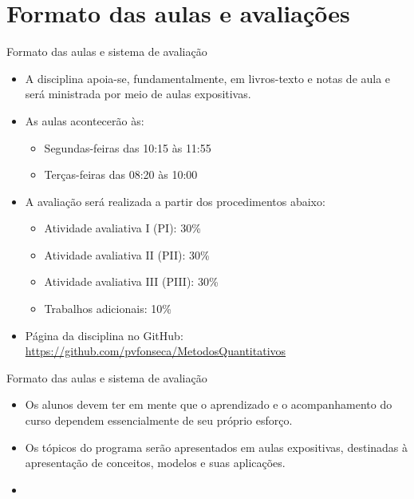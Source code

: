 \documentclass[10pt]{beamer}
\begin{document}
\section{Formato das aulas e avaliações}
\begin{frame}{Formato das aulas e sistema de avaliação}
    \begin{itemize}
        \item A disciplina apoia-se, fundamentalmente, em livros-texto e notas de aula e será ministrada por meio de aulas expositivas.\bigskip

        \item As aulas acontecerão às:
              \begin{itemize}
                  \item Segundas-feiras das 10:15 às 11:55
                  \item Terças-feiras das 08:20 às 10:00\bigskip
              \end{itemize}

        \item A avaliação será realizada a partir dos procedimentos abaixo:
              \begin{itemize}
                  \item Atividade avaliativa I (PI): 30\%
                  \item Atividade avaliativa II (PII): 30\%
                  \item Atividade avaliativa III (PIII): 30\%
                  \item Trabalhos adicionais: 10\%\bigskip
              \end{itemize}

        \item Página da disciplina no GitHub: \href{github.com/pvfonseca/MetodosQuantitativos}{https://github.com/pvfonseca/MetodosQuantitativos}
    \end{itemize}
\end{frame}

\begin{frame}{Formato das aulas e sistema de avaliação}
    \begin{itemize}
        \item Os alunos devem ter em mente que o aprendizado e o acompanhamento do curso dependem essencialmente de seu próprio esforço.\bigskip

        \item Os tópicos do programa serão apresentados em aulas expositivas, destinadas à apresentação de conceitos, modelos e suas aplicações.\bigskip

        \item[\emoji{warning}] 
    \end{itemize}

\end{frame}
\end{document}
